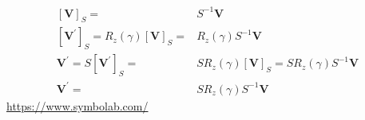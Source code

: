\documentclass[
]{book}
\theoremstyle{definition}
\theoremstyle{definition}
\theoremstyle{definition}
\theoremstyle{definition}
\theoremstyle{remark}
\begin{document}
\[
\begin{aligned}
\left[\boldsymbol{V}\right]_{S}= & S^{-1}\boldsymbol{V}\\
\left[\boldsymbol{V}^{\prime}\right]_{S}=R_{{\scriptscriptstyle z}}\left(\gamma\right)\left[\boldsymbol{V}\right]_{S}= & R_{{\scriptscriptstyle z}}\left(\gamma\right)S^{-1}\boldsymbol{V}\\
\boldsymbol{V}^{\prime}=S\left[\boldsymbol{V}^{\prime}\right]_{S}= & SR_{{\scriptscriptstyle z}}\left(\gamma\right)\left[\boldsymbol{V}\right]_{S}=SR_{{\scriptscriptstyle z}}\left(\gamma\right)S^{-1}\boldsymbol{V}\\
\boldsymbol{V}^{\prime}= & SR_{{\scriptscriptstyle z}}\left(\gamma\right)S^{-1}\boldsymbol{V}
\end{aligned}
\]
\url{https://www.symbolab.com/}
\end{document}
